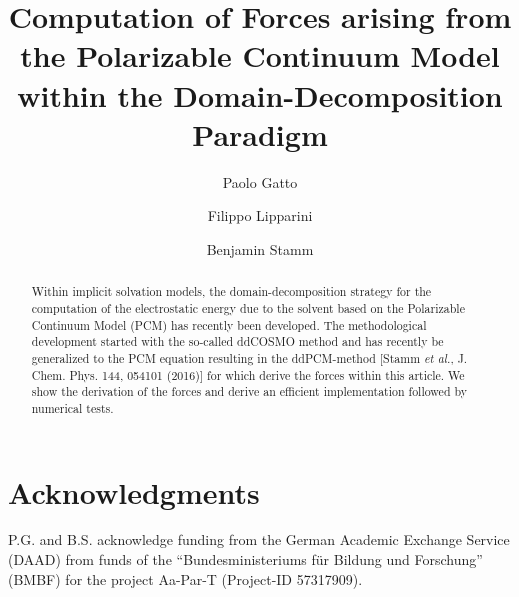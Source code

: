 \documentclass[aip,jcp,a4paper]{revtex4-1}
\begin{document}
\title{Computation of Forces arising from the Polarizable Continuum Model within the Domain-Decomposition Paradigm}

\author{Paolo Gatto}
\affiliation{}

\author{Filippo Lipparini}
\affiliation{}

\author{Benjamin Stamm}
\affiliation{}



\begin{abstract}
Within implicit solvation models, the domain-decomposition strategy for the computation of the electrostatic energy due to the solvent based on the Polarizable Continuum Model (PCM) has recently been developed. 
The methodological development started with the so-called ddCOSMO method and has recently be generalized to the PCM equation resulting in the ddPCM-method [Stamm {\it et al.}, J. Chem. Phys. 144, 054101 (2016)] for which derive the forces within this article. 
We show the derivation of the forces and derive an efficient implementation followed by numerical tests.

\end{abstract}

\maketitle


%






\section*{Acknowledgments}
P.G. and B.S. acknowledge funding from the German Academic Exchange Service (DAAD) from funds of the ``Bundesministeriums f\"ur Bildung und Forschung'' (BMBF) for the project Aa-Par-T (Project-ID 57317909).
\appendix




%



\end{document}
